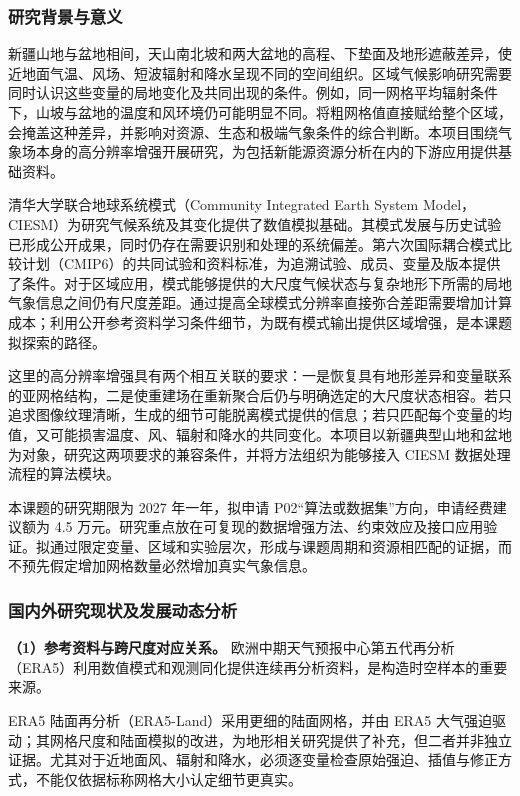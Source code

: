 \justifying
\NSFCBodyText

\subsubsection{研究背景与意义}

新疆山地与盆地相间，天山南北坡和两大盆地的高程、下垫面及地形遮蔽差异，使近地面气温、风场、短波辐射和降水呈现不同的空间组织。区域气候影响研究需要同时认识这些变量的局地变化及共同出现的条件。例如，同一网格平均辐射条件下，山坡与盆地的温度和风环境仍可能明显不同。将粗网格值直接赋给整个区域，会掩盖这种差异，并影响对资源、生态和极端气象条件的综合判断。本项目围绕气象场本身的高分辨率增强开展研究，为包括新能源资源分析在内的下游应用提供基础资料。

清华大学联合地球系统模式（Community Integrated Earth System Model，CIESM）为研究气候系统及其变化提供了数值模拟基础。其模式发展与历史试验已形成公开成果，同时仍存在需要识别和处理的系统偏差\cite{Lin2020CIESM}。第六次国际耦合模式比较计划（CMIP6）的共同试验和资料标准，为追溯试验、成员、变量及版本提供了条件\cite{Eyring2016CMIP6}。对于区域应用，模式能够提供的大尺度气候状态与复杂地形下所需的局地气象信息之间仍有尺度差距。通过提高全球模式分辨率直接弥合差距需要增加计算成本；利用公开参考资料学习条件细节，为既有模式输出提供区域增强，是本课题拟探索的路径。

这里的高分辨率增强具有两个相互关联的要求：一是恢复具有地形差异和变量联系的亚网格结构，二是使重建场在重新聚合后仍与明确选定的大尺度状态相容。若只追求图像纹理清晰，生成的细节可能脱离模式提供的信息；若只匹配每个变量的均值，又可能损害温度、风、辐射和降水的共同变化。本项目以新疆典型山地和盆地为对象，研究这两项要求的兼容条件，并将方法组织为能够接入 CIESM 数据处理流程的算法模块。

本课题的研究期限为 2027 年一年，拟申请 P02“算法或数据集”方向，申请经费建议额为 4.5 万元。研究重点放在可复现的数据增强方法、约束效应及接口应用验证。拟通过限定变量、区域和实验层次，形成与课题周期和资源相匹配的证据，而不预先假定增加网格数量必然增加真实气象信息。

\subsubsection{国内外研究现状及发展动态分析}

\textbf{（1）参考资料与跨尺度对应关系。}
欧洲中期天气预报中心第五代再分析（ERA5）利用数值模式和观测同化提供连续再分析资料，是构造时空样本的重要来源\cite{Hersbach2020ERA5}。

ERA5 陆面再分析（ERA5-Land）采用更细的陆面网格，并由 ERA5 大气强迫驱动；其网格尺度和陆面模拟的改进，为地形相关研究提供了补充，但二者并非独立证据\cite{Munoz2021ERA5Land}。尤其对于近地面风、辐射和降水，必须逐变量检查原始强迫、插值与修正方式，不能仅依据标称网格大小认定细节更真实。

